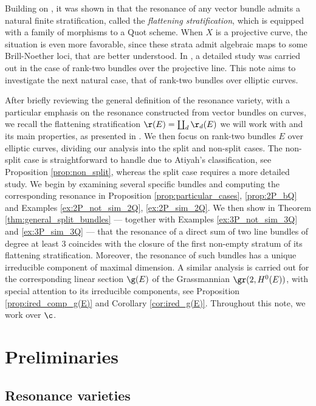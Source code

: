 \documentclass[10pt, leqno]{amsart}
\begin{document}
Building on \cite{aprodu_reduced_2024}, it was shown in \cite{aprodu_linear_2025} that the resonance of any vector bundle admits a natural finite stratification, called the \emph{flattening stratification}, which is equipped with a family of morphisms to a Quot scheme. When $X$ is a projective curve, the situation is even more favorable, since these strata admit algebraic maps to some Brill-Noether loci, that are better understood. In \cite{aprodu_linear_2025}, a detailed study was carried out in the case of rank-two bundles over the projective line. This note aims to investigate the next natural case, that of rank-two bundles over elliptic curves.

\medskip

After briefly reviewing the general definition of the resonance variety, with a particular emphasis on the resonance constructed from vector bundles on curves, we recall the flatte\-ning stratification $\r(E) = \coprod_d \r_d(E)$ we will work with and its main properties, as presented in \cite{aprodu_linear_2025}. We then focus on rank-two bundles $E$ over elliptic curves, dividing our analysis into the split and non-split cases. The non-split case is straightforward to handle due to Atiyah’s classification, see Proposition \ref{prop:non_split}, whereas the split case requires a more detailed study. We begin by examining several specific bundles and computing the corresponding resonance in Proposition \ref{prop:particular_cases}, \ref{prop:2P_bQ} and Examples \ref{ex:2P_not_sim_2Q}, \ref{ex:2P_sim_2Q}. We then show in Theorem \ref{thm:general_split_bundles} --- together with Examples \ref{ex:3P_not_sim_3Q} and \ref{ex:3P_sim_3Q} --- that the resonance of a direct sum of two line bundles of degree at least $3$ coincides with the closure of the first non-empty stratum of its flattening stratification. Moreover, the resonance of such bundles has a unique irreducible component of maximal dimension. A similar analysis is carried out for the corresponding linear section $\g(E)$ of the Grassmannian $\gr(2, H^0(E))$, with special attention to its irreducible components, see Proposition \ref{prop:ired_comp_g(E)} and Corollary \ref{cor:ired_g(E)}. Throughout this note, we work over $\c$.


\section{Preliminaries}

\subsection{Resonance varieties} 
\end{document}
